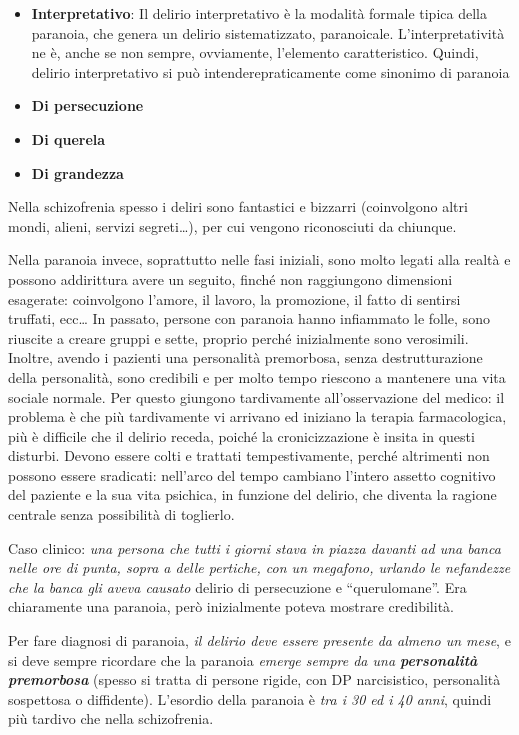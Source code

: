 \documentclass[]{article}
\begin{document}
\begin{itemize}
\item
  \textbf{Interpretativo}: Il delirio interpretativo è la modalità
  formale tipica della paranoia, che genera un delirio sistematizzato,
  paranoicale. L'interpretatività ne è, anche se non sempre, ovviamente,
  l'elemento caratteristico. Quindi, delirio interpretativo si può
  intenderepraticamente come sinonimo di paranoia
\item
  \textbf{Di persecuzione}
\item
  \textbf{Di querela}
\item
  \textbf{Di grandezza}
\end{itemize}

Nella schizofrenia spesso i deliri sono fantastici e bizzarri
(coinvolgono altri mondi, alieni, servizi segreti\ldots{}), per cui
vengono riconosciuti da chiunque.

Nella paranoia invece, soprattutto nelle fasi iniziali, sono molto
legati alla realtà e possono addirittura avere un seguito, finché non
raggiungono dimensioni esagerate: coinvolgono l'amore, il lavoro, la
promozione, il fatto di sentirsi truffati, ecc\ldots{} In passato,
persone con paranoia hanno infiammato le folle, sono riuscite a creare
gruppi e sette, proprio perché inizialmente sono verosimili. Inoltre,
avendo i pazienti una personalità premorbosa, senza destrutturazione
della personalità, sono credibili e per molto tempo riescono a mantenere
una vita sociale normale. Per questo giungono tardivamente
all'osservazione del medico: il problema è che più tardivamente vi
arrivano ed iniziano la terapia farmacologica, più è difficile che il
delirio receda, poiché la cronicizzazione è insita in questi disturbi.
Devono essere colti e trattati tempestivamente, perché altrimenti non
possono essere sradicati: nell'arco del tempo cambiano l'intero assetto
cognitivo del paziente e la sua vita psichica, in funzione del delirio,
che diventa la ragione centrale senza possibilità di toglierlo.

Caso clinico: \emph{una persona che tutti i giorni stava in piazza
davanti ad una banca nelle ore di punta, sopra a delle pertiche, con un
megafono, urlando le nefandezze che la banca gli aveva causato} delirio
di persecuzione e ``querulomane''. Era chiaramente una paranoia, però
inizialmente poteva mostrare credibilità.

Per fare diagnosi di paranoia, \emph{il delirio deve essere presente da
almeno un mese}, e si deve sempre ricordare che la paranoia \emph{emerge
sempre da una \textbf{personalità premorbosa}} (spesso si tratta di
persone rigide, con DP narcisistico, personalità sospettosa o
diffidente). L'esordio della paranoia è \emph{tra i 30 ed i 40 anni},
quindi più tardivo che nella schizofrenia.
\end{document}
